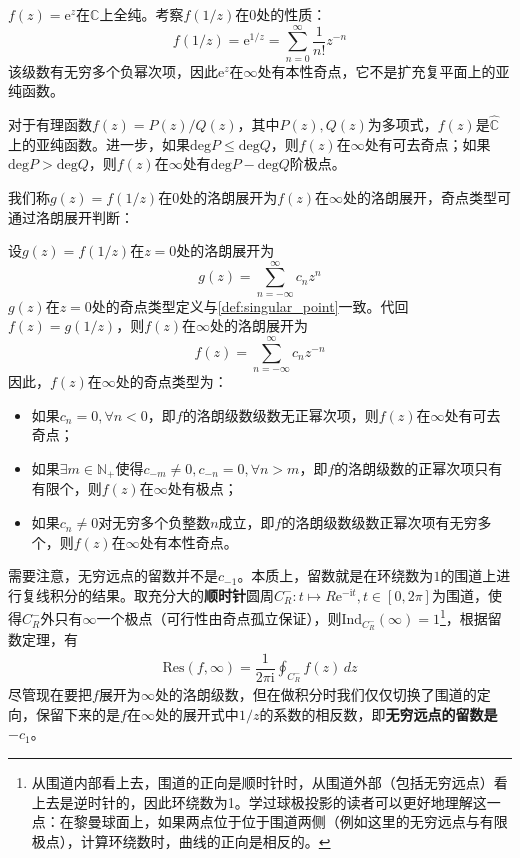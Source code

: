 \begin{example}
    $f(z)=\mathrm{e}^{z}$在$\mathbb{C}$上全纯。考察$f(1/z)$在$0$处的性质：
    \[f(1/z)=\mathrm{e}^{1/z}=\sum_{n=0}^{\infty}\frac{1}{n!}z^{-n}\]
    该级数有无穷多个负幂次项，因此$\mathrm{e}^{z}$在$\infty$处有本性奇点，它不是扩充复平面上的亚纯函数。
\end{example}
\begin{example}
    对于有理函数$f(z)=P(z)/Q(z)$，其中$P(z),Q(z)$为多项式，$f(z)$是$\hat{\mathbb{C}}$上的亚纯函数。进一步，如果$\mathrm{deg}P\leq\mathrm{deg}Q$，则$f(z)$在$\infty$处有可去奇点；如果$\mathrm{deg}P>\mathrm{deg}Q$，则$f(z)$在$\infty$处有$\mathrm{deg}P-\mathrm{deg}Q$阶极点。
\end{example}

我们称$g(z)=f(1/z)$在$0$处的洛朗展开为$f(z)$在$\infty$处的洛朗展开，奇点类型可通过洛朗展开判断：
\begin{definition}[无穷远点的洛朗展开与奇点类型]\label{def:singular_point_infty}
    设$g(z)=f(1/z)$在$z=0$处的洛朗展开为
    \[g(z)=\sum_{n=-\infty}^{\infty}c_n z^{n}\]
    $g(z)$在$z=0$处的奇点类型定义与\cref{def:singular_point}一致。代回$f(z)=g(1/z)$，则$f(z)$在$\infty$处的洛朗展开为
    \[f(z)=\sum_{n=-\infty}^{\infty}c_n z^{-n}\]
    因此，$f(z)$在$\infty$处的奇点类型为：
    \begin{itemize}
        \item 如果$c_n=0,\forall n<0$，即$f$的洛朗级数级数无正幂次项，则$f(z)$在$\infty$处有可去奇点；
        \item 如果$\exists m\in\mathbb{N}_+$使得$c_{-m}\neq 0,c_{-n}=0,\forall n>m$，即$f$的洛朗级数的正幂次项只有有限个，则$f(z)$在$\infty$处有极点；
        \item 如果$c_n\neq 0$对无穷多个负整数$n$成立，即$f$的洛朗级数级数正幂次项有无穷多个，则$f(z)$在$\infty$处有本性奇点。
    \end{itemize}
\end{definition}

需要注意，无穷远点的留数并不是$c_{-1}$。本质上，留数就是在环绕数为$1$的围道上进行复线积分的结果。取充分大的\textbf{顺时针}圆周$C^-_R:t\mapsto R\mathrm{e}^{-\mathrm{i}t},t\in[0,2\pi]$为围道，使得$C^-_R$外只有$\infty$一个极点（可行性由奇点孤立保证），则$\mathrm{Ind}_{C^-_R}(\infty)=1$\footnote{从围道内部看上去，围道的正向是顺时针时，从围道外部（包括无穷远点）看上去是逆时针的，因此环绕数为1。学过球极投影的读者可以更好地理解这一点：在黎曼球面上，如果两点位于位于围道两侧（例如这里的无穷远点与有限极点），计算环绕数时，曲线的正向是相反的。}，根据留数定理，有
\begin{align*}
    \mathrm{Res}(f,\infty)=\dfrac{1}{2\pi \mathrm{i}}\oint_{C^-_R}f(z)\,dz\tag{$*$}
\end{align*}
尽管现在要把$f$展开为$\infty$处的洛朗级数，但在做积分时我们仅仅切换了围道的定向，保留下来的是$f$在$\infty$处的展开式中$1/z$的系数的相反数，即\textbf{无穷远点的留数是$-c_{1}$}。

